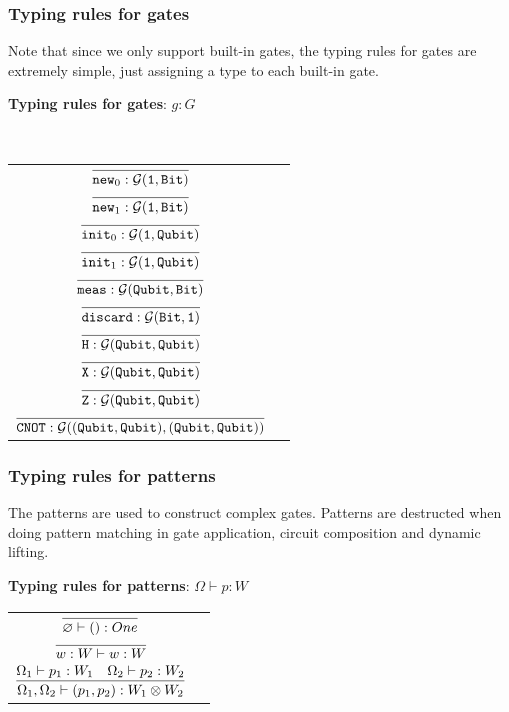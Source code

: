 \subsubsection{Typing rules for gates}
Note that since we only support built-in gates, the typing rules for gates are extremely simple, just assigning a type to each built-in gate.

\noindent \textbf{Typing rules for gates}: $\boxed{g : G}$

~

\renewcommand\arraystretch{2.5}
\begin{longtable}[c]{cr}
  $ \infer{\new_0 : \calG(\One, \Bit)}{}$ & \\
  $ \infer{\new_1 : \calG(\One, \Bit)}{}$ & \\
  $ \infer{\init_0 : \calG(\One, \Qubit)}{}$ & \\
  $ \infer{\init_1 : \calG(\One, \Qubit)}{}$ & \\
  $ \infer{\meas : \calG(\Qubit, \Bit)}{}$ & \\
  $ \infer{\discard : \calG(\Bit, \One)}{}$ & \\
  $ \infer{\Ha : \calG(\Qubit, \Qubit)}{}$ & \\
  $ \infer{\X : \calG(\Qubit, \Qubit)}{}$ & \\
  $ \infer{\Z : \calG(\Qubit, \Qubit)}{}$ & \\
  $ \infer{\CNOT : \calG((\Qubit, \Qubit), (\Qubit, \Qubit))}{}$ & \\
\end{longtable}

\subsubsection{Typing rules for patterns}
The patterns are used to construct complex gates.
Patterns are destructed when doing pattern matching in gate application, circuit composition and dynamic lifting.

\noindent \textbf{Typing rules for patterns}: $\boxed{\Omega \vdash p : W}$
\renewcommand\arraystretch{2.5}
\begin{longtable}[c]{cr}
  $ \infer{\varnothing \vdash ():One}{}$ & \\
  $ \infer{w:W \vdash w:W}{}$ & \\
  $ \infer{\Omega_1, \Omega_2 \vdash (p_1,p_2):W_1\otimes W_2}{\Omega_1 \vdash p_1 : W_1  &\Omega_2 \vdash p_2 : W_2} $ & \\
\end{longtable}

